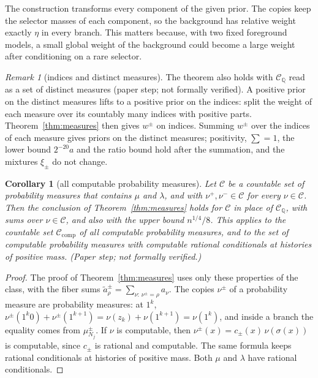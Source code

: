 \documentclass[11pt]{article}
\newcommand{\cCQ}{\mathcal{C}_{\mathbb{Q}}}
\newcommand{\cCcomp}{\mathcal{C}_{\mathrm{comp}}}
\newtheorem{corollary}[theorem]{Corollary}
\theoremstyle{definition}
\theoremstyle{remark}
\newtheorem{remark}[theorem]{Remark}
\begin{document}
The construction transforms every component of the given prior. The copies
keep the selector masses of each component, so the background has relative
weight exactly $\eta$ in every branch. This matters because, with two fixed
foreground models, a small global weight of the background could
become a large weight after conditioning on a rare selector.

\begin{remark}[indices and distinct measures]\label{rem:indices}
The theorem also holds with $\cCQ$ read as a set of distinct measures (paper
step; not formally verified). A positive prior on the distinct measures lifts to a positive prior on
the indices: split the weight of each measure over its countably many indices
with positive parts. Theorem~\ref{thm:measures} then gives $w^\pm$ on indices.
Summing $w^\pm$ over the indices of each measure gives priors on the distinct
measures; positivity, $\sum=1$, the lower bound $2^{-20}a$ and the ratio bound
hold after the summation, and the mixtures $\xi_\pm$ do not change.
\end{remark}

\begin{corollary}[all computable probability measures]\label{cor:allmeasures}
Let $\mathcal C$ be a countable set of probability measures that contains
$\mu$ and $\lambda$, and with $\nu^+,\nu^-\in\mathcal C$ for every
$\nu\in\mathcal C$. Then the conclusion of Theorem~\ref{thm:measures} holds
for $\mathcal C$ in place of $\cCQ$, with sums over $\nu\in\mathcal C$, and
also with the upper bound $n^{1/4}/8$. This applies to the countable set
$\cCcomp$ of all computable probability measures, and to the set of computable probability
measures with computable rational conditionals at histories of positive mass.
(Paper step; not formally verified.)
\end{corollary}

\begin{proof}
The proof of Theorem~\ref{thm:measures} uses only these properties of the
class, with the fiber sums $\tilde a^\pm_\rho=\sum_{\nu:\,\nu^\pm=\rho}a_\nu$. The
copies $\nu^\pm$ of a probability measure are probability measures: at $1^k$,
$\nu^\pm(1^k0)+\nu^\pm(1^{k+1})=\nu(z_k)+\nu(1^{k+1})=\nu(1^k)$, and inside a
branch the equality comes from $\mu^\pm_{N_j}$. If $\nu$ is computable, then
$\nu^\pm(x)=c_\pm(x)\,\nu(\sigma(x))$ is computable, since $c_\pm$ is rational and
computable. The same formula keeps rational conditionals at histories of
positive mass. Both $\mu$ and $\lambda$ have rational conditionals.
\end{proof}
\end{document}
